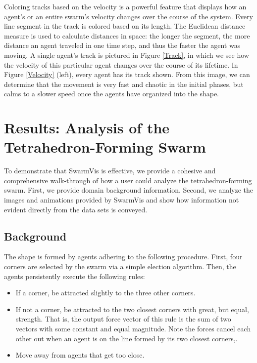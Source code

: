\documentclass{vgtc}
\begin{document}
Coloring tracks based on the velocity is a powerful feature that displays how an agent's or an entire swarm's
velocity changes over the course of the system.
Every line segment in the track is colored based on its length. The Euclidean distance measure is used to calculate distances in space: the longer the segment, the more distance an agent traveled in one time step,
and thus the faster the agent was moving.
A single agent's track is pictured in Figure \ref{Track}, in which we see how the velocity of this particular agent changes over the course of its lifetime.
In Figure \ref{Velocity} (left), every agent has its track shown.
From this image, we can determine that the movement is very fast and chaotic in the initial phases, but calms to a slower speed once the agents have organized into the shape.

\section{Results: Analysis of the Tetrahedron-Forming Swarm}

To demonstrate that SwarmVis is effective,
we provide a cohesive and comprehensive walk-through of how a user could
analyze the tetrahedron-forming swarm. First, we provide domain background information.
Second, we analyze the images and animations provided by SwarmVis and show how information not evident directly from the data sets is conveyed.

\subsection{Background}

The shape is formed by agents adhering to the following procedure.
First, four corners are selected by the swarm via a simple election algorithm.
Then, the agents persistently execute the following rules:
\begin{itemize}
	\item If a corner, be attracted slightly to the three other corners.
	\item If not a corner, be attracted to the two closest corners with great, but equal, strength.
	That is, the output force vector of this rule is the sum of two vectors with some constant and equal magnitude.
	Note the forces cancel each other out when an agent is on the line formed by its two closest corners,.
	\item Move away from agents that get too close.
\end{itemize}
\end{document}
